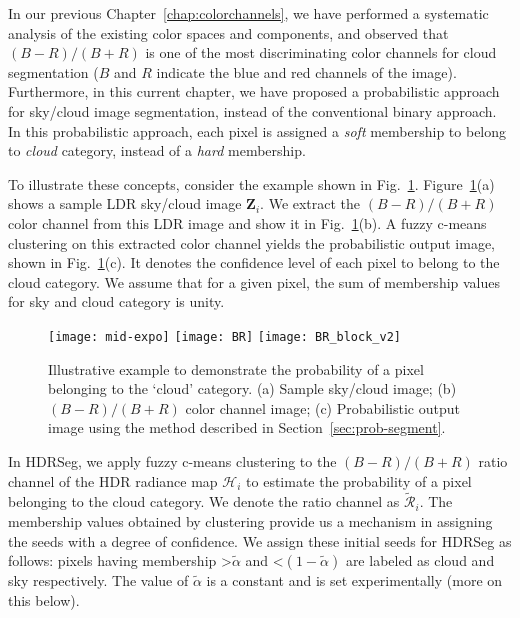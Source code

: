In our previous Chapter~\ref{chap:colorchannels}, we have performed a systematic analysis of the existing color spaces and components, and observed that $(B-R)/(B+R)$ is one of the most discriminating color channels for cloud segmentation ($B$ and $R$ indicate the blue and red channels of the image). Furthermore, in this current chapter, we have proposed a probabilistic approach for sky/cloud image segmentation, instead of the conventional binary approach. In this probabilistic approach, each pixel is assigned a \emph{soft} membership to belong to \emph{cloud} category, instead of a \emph{hard} membership. 

To illustrate these concepts, consider the example shown in Fig.~\ref{fig:see-seeds}. Figure~\ref{fig:see-seeds}(a) shows a sample LDR sky/cloud image $\mathbf{Z}_i$. We extract the $(B-R)/(B+R)$ color channel from this LDR image and show it in Fig.~\ref{fig:see-seeds}(b). A fuzzy c-means clustering on this extracted color channel yields the probabilistic output image, shown in Fig.~\ref{fig:see-seeds}(c). It denotes the confidence level of each pixel to belong to the cloud category. We assume that for a given pixel, the sum of membership values for sky and cloud category is unity.

\begin{figure}[htb]
\centering
\texttt{[image: mid-expo]}\hspace{0.5mm}    
\texttt{[image: BR]}\hspace{0.5mm} 
\texttt{[image: BR\_block\_v2]}\hspace{0.5mm}\\
\caption[Illustrative example to show the ratio image and probabilistic segmented image.]{Illustrative example to demonstrate the probability of a pixel belonging to the `cloud' category. (a) Sample sky/cloud image; (b) $(B-R)/(B+R)$ color channel image; (c) Probabilistic output image using the method described in Section~\ref{sec:prob-segment}.}
\label{fig:see-seeds}
\end{figure}

In HDRSeg, we apply fuzzy c-means clustering to the $(B-R)/(B+R)$ ratio channel of the HDR radiance map $\mathcal{H}_i$ to estimate the probability of a pixel belonging to the cloud category. We denote the ratio channel as $\tilde{\mathcal{R}}_i$. The membership values obtained by clustering provide us a mechanism in assigning the seeds with a degree of confidence. We assign these initial seeds for HDRSeg as follows: pixels having membership \textgreater $\tilde{\alpha}$ and \textless $(1-{\tilde{\alpha}})$ are labeled as cloud and sky respectively. The value of $\tilde{\alpha}$ is a constant and is set experimentally (more on this below).

